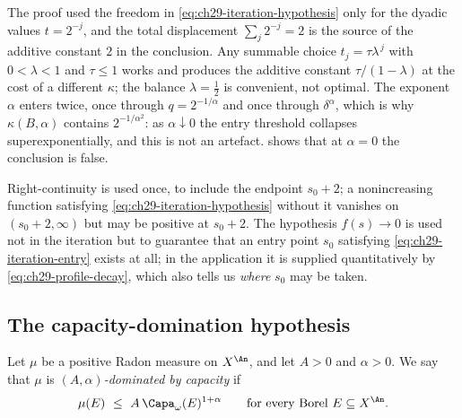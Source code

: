 \begin{remark}
\label{rem:ch29-iteration-constants}
The proof used the freedom in \eqref{eq:ch29-iteration-hypothesis} only for
the dyadic values \(t=2^{-j}\), and the total displacement \(\sum_j2^{-j}=2\)
is the source of the additive constant \(2\) in the conclusion.  Any
summable choice \(t_j=\tau\lambda^{\,j}\) with \(0<\lambda<1\) and
\(\tau\leq1\) works and produces the additive constant
\(\tau/(1-\lambda)\) at the cost of a different \(\kappa\); the balance
\(\lambda=\tfrac12\) is convenient, not optimal.  The exponent
\(\alpha\) enters twice, once through \(q=2^{-1/\alpha}\) and once through
\(\delta^\alpha\), which is why \(\kappa(B,\alpha)\) contains
\(2^{-1/\alpha^2}\): as \(\alpha\downarrow0\) the entry threshold collapses
superexponentially, and this is not an artefact.
 shows that at \(\alpha=0\) the conclusion is
false.
\end{remark}

\begin{remark}
\label{rem:ch29-iteration-hypotheses}
Right-continuity is used once, to include the endpoint \(s_0+2\); a
nonincreasing function satisfying \eqref{eq:ch29-iteration-hypothesis}
without it vanishes on \((s_0+2,\infty)\) but may be positive at
\(s_0+2\).  The hypothesis \(f(s)\to0\) is used not in the iteration but to
guarantee that an entry point \(s_0\) satisfying
\eqref{eq:ch29-iteration-entry} exists at all; in the application it is
supplied quantitatively by \eqref{eq:ch29-profile-decay}, which also tells
us \emph{where} \(s_0\) may be taken.
\end{remark}

\subsection{The capacity-domination hypothesis}
\label{sec:ch29-domination-hypothesis}

\begin{definition}
\label{def:ch29-capacity-domination}
Let \(\mu\) be a positive Radon measure on \(X^{\An}\), and let
\(A>0\) and \(\alpha>0\).  We say that \(\mu\) is \emph{\((A,\alpha)\)-dominated
by capacity} if
\begin{equation}
\label{eq:ch29-capacity-domination}
 \mu(E)\ \leq\ A\,\Capa_\omega(E)^{1+\alpha}
 \qquad\text{for every Borel }E\subseteq X^{\An}.
\end{equation}
\end{definition}

